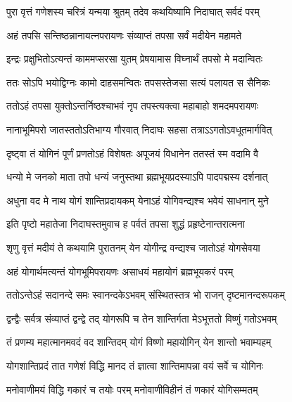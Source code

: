 
\twolineshloka
{पुरा वृत्तं गणेशस्य चरित्रं यन्मया श्रुतम्}
{तदेव कथयिष्यामि निदाघात् सर्वदं परम्} %

\twolineshloka
{अहं तपसि सन्तिष्ठन्नानायत्नपरायणः}
{संव्याप्तं तपसा सर्वं मदीयेन महामते} %

\twolineshloka
{इन्द्रः प्रक्षुभितोऽत्यन्तं काममप्सरसा युतम्}
{प्रेषयामास विघ्नार्थं तपसो मे मदान्वितः} %

\twolineshloka
{ततः सोऽपि भयोद्विग्नः कामो दाहसमन्वितः}
{तपसस्तेजसा सत्यं पलायत स सैनिकः} %

\twolineshloka
{ततोऽहं तपसा युक्तोऽन्तर्निष्ठश्चाभवं नृप}
{तपस्त्यक्त्वा महाबाहो शमदमपरायणः} %

\twolineshloka
{नानाभूमिपरो जातस्ततोऽतिभाग्य गौरवात्}
{निदाघः सहसा तत्राऽऽगतोऽवधूतमार्गवित्} %

\twolineshloka
{दृष्ट्वा तं योगिनं पूर्णं प्रणतोऽहं विशेषतः}
{अपूजयं विधानेन ततस्तं स्म वदामि वै} %

\twolineshloka
{धन्यो मे जनको माता तपो धन्यं जनुस्तथा}
{ब्रह्मभूयप्रदस्याऽपि पादपद्मस्य दर्शनात्} %

\twolineshloka
{अधुना वद मे नाथ योगं शान्तिप्रदायकम्}
{येनाऽहं योगिवन्द्यश्च भवेयं साधनान् मुने} %


\twolineshloka
{इति पृष्टो महातेजा निदाघस्तमुवाच ह}
{पर्वतं तपसा शुद्धं प्रहृष्टेनान्तरात्मना} %


\twolineshloka
{श‍ृणु वृत्तं मदीयं ते कथयामि पुरातनम्}
{येन योगीन्द्र वन्द्यश्च जातोऽहं योगसेवया} %

\twolineshloka
{अहं योगार्थमत्यन्तं योगभूमिपरायणः}
{असाधयं महायोगं ब्रह्मभूयकरं परम्} %

\twolineshloka
{ततोऽन्तेऽहं सदानन्दे समः स्वानन्दकेऽभवम्}
{संस्थितस्तत्र भो राजन् दृष्टमानन्दरूपकम्} %

\twolineshloka
{द्वन्द्वैः सर्वत्र संव्याप्तं द्वन्द्वे तद् योगरूपि च}
{तेन शान्तिर्गता मेऽभूत्ततो विष्णुं गतोऽभवम्} %

\twolineshloka
{तं प्रणम्य महात्मानमवदं वद शान्तिदम्}
{योगं विष्णो महायोगिन् येन शान्तो भवाम्यहम्} %


\twolineshloka
{योगशान्तिप्रदं तात गणेशं विद्धि मानद}
{तं ज्ञात्वा शान्तिमापन्ना वयं सर्वे च योगिनः} %

\twolineshloka
{मनोवाणीमयं विद्धि गकारं च तयोः परम्}
{मनोवाणीविहीनं तं णकारं योगिसम्मतम्} %

